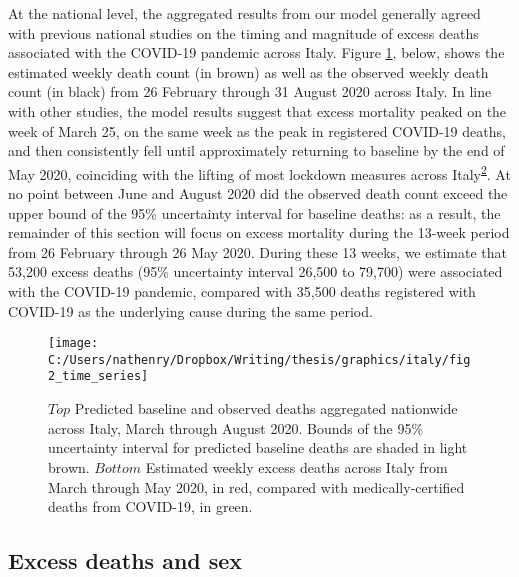 \documentclass[
]{article}
\begin{document}
At the national level, the aggregated results from our model generally agreed with previous national studies on the timing and magnitude of excess deaths associated with the COVID-19 pandemic across Italy. Figure \ref{fig:time-series}, below, shows the estimated weekly death count (in brown) as well as the observed weekly death count (in black) from 26 February through 31 August 2020 across Italy. In line with other studies, the model results suggest that excess mortality peaked on the week of March 25, on the same week as the peak in registered COVID-19 deaths, and then consistently fell until approximately returning to baseline by the end of May 2020, coinciding with the lifting of most lockdown measures across Italy\textsuperscript{\protect\hyperlink{ref-Alicandro2020}{2}}⁠. At no point between June and August 2020 did the observed death count exceed the upper bound of the 95\% uncertainty interval for baseline deaths: as a result, the remainder of this section will focus on excess mortality during the 13-week period from 26 February through 26 May 2020. During these 13 weeks, we estimate that 53,200 excess deaths (95\% uncertainty interval 26,500 to 79,700) were associated with the COVID-19 pandemic, compared with 35,500 deaths registered with COVID-19 as the underlying cause during the same period.

\begin{figure}[!hbt]

{\centering \texttt{[image: C:/Users/nathenry/Dropbox/Writing/thesis/graphics/italy/fig2\_time\_series]} 

}

\caption{\(Top\) Predicted baseline and observed deaths aggregated nationwide across Italy, March through August 2020. Bounds of the 95\% uncertainty interval for predicted baseline deaths are shaded in light brown. \(Bottom\) Estimated weekly excess deaths across Italy from March through May 2020, in red, compared with medically-certified deaths from COVID-19, in green.}\label{fig:time-series}
\end{figure}

\hypertarget{excess-deaths-and-sex}{%
\subsection{Excess deaths and sex}\label{excess-deaths-and-sex}}
\end{document}
